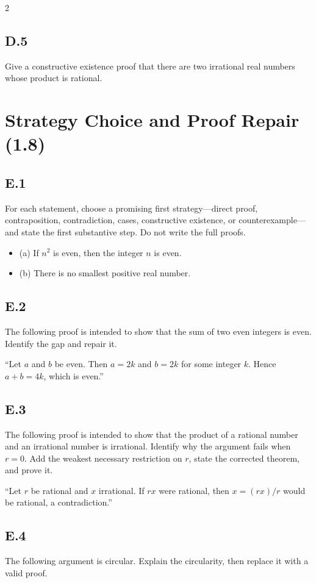 \documentclass{article}
\begin{document}
\begin{multicols}{2}
\subsection*{D.5}
Give a constructive existence proof that there are two irrational real numbers
whose product is rational.

\section*{Strategy Choice and Proof Repair (1.8)}

\subsection*{E.1}
For each statement, choose a promising first strategy---direct proof,
contraposition, contradiction, cases, constructive existence, or
counterexample---and state the first substantive step. Do not write the full
proofs.
\begin{itemize}
  \item (a) If $n^2$ is even, then the integer $n$ is even.
  \item (b) There is no smallest positive real number.
\end{itemize}

\subsection*{E.2}
The following proof is intended to show that the sum of two even integers is even. Identify the gap and repair it.

``Let $a$ and $b$ be even. Then $a=2k$ and $b=2k$ for some integer $k$. Hence $a+b=4k$, which is even.''

\subsection*{E.3}
The following proof is intended to show that the product of a rational number
and an irrational number is irrational. Identify why the argument fails when
$r=0$. Add the weakest necessary restriction on $r$, state the corrected
theorem, and prove it.

``Let $r$ be rational and $x$ irrational. If $rx$ were rational, then $x=(rx)/r$ would be rational, a contradiction.''

\subsection*{E.4}
The following argument is circular. Explain the circularity, then replace it with a valid proof.


\end{multicols}
\end{document}
